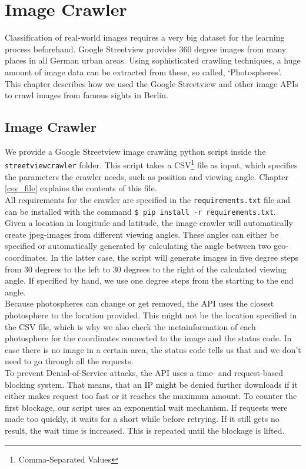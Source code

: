 \section{Image Crawler}
Classification of real-world images requires a very big dataset for the learning process beforehand. Google Streetview provides 360 degree images from many places in all German urban areas. Using sophisticated crawling techniques, a huge amount of image data can be extracted from these, so called, `Photospheres'.\\
This chapter describes how we used the Google Streetview and other image APIs to crawl images from famous sights in Berlin.

\subsection{Image Crawler}
We provide a Google Streetview image crawling python script inside the\\\texttt{streetviewcrawler} folder. This script takes a CSV\footnote{Comma-Separated Values} file as input, which specifies the parameters the crawler needs, such as position and viewing angle. Chapter \ref{csv_file} explains the contents of this file.\\
All requirements for the crawler are specified in the \texttt{requirements.txt} file and can be installed with the command \texttt{\$ pip install -r requirements.txt}.\\
Given a location in longitude and latitude, the image crawler will automatically create jpeg-images from different viewing angles. These angles can either be specified or automatically generated by calculating the angle between two geo-coordinates. In the latter case, the script will generate images in five degree steps from 30 degrees to the left to 30 degrees to the right of the calculated viewing angle. If specified by hand, we use one degree steps from the starting to the end angle.\\
Because photospheres can change or get removed, the API uses the closest photosphere to the location provided. This might not be the location specified in the CSV file, which is why we also check the metainformation of each photosphere for the coordinates connected to the image and the status code. In case there is no image in a certain area, the status code tells us that and we don't need to go through all the requests.\\
To prevent Denial-of-Service attacks, the API uses a time- and request-based blocking system. That means, that an IP might be denied further downloads if it either makes request too fast or it reaches the maximum amount. To counter the first blockage, our script uses an exponential wait mechanism. If requests were made too quickly, it waits for a short while before retrying. If it still gets no result, the wait time is increased. This is repeated until the blockage is lifted.\\
